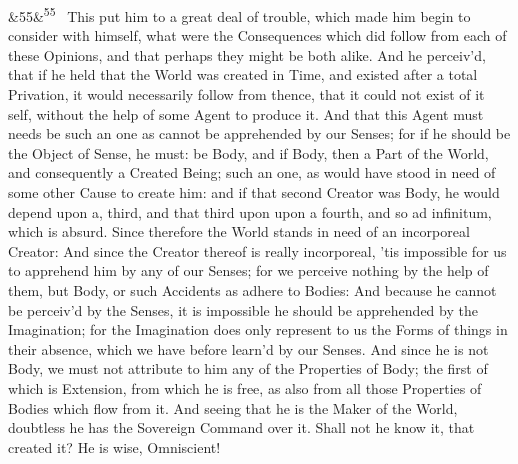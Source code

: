 \documentclass[12pt]{article}
\newcommand{\para}[1][]{\par\noindent\ifx&#1&\else\textsuperscript{\footnotesize #1}~\fi}
\begin{document}
\para[55] This put him to a great deal of trouble, which made him begin to consider with himself, what were the Consequences which did follow from each of these Opinions, and that perhaps they might be both alike. And he perceiv'd, that if he held that the World was created in Time, and existed after a total Privation, it would necessarily follow from thence, that it could not exist of it self, without the help of some Agent to produce it. And that this Agent must needs be such an one as cannot be apprehended by our Senses; for if he should be the Object of Sense, he must: be Body, and if Body, then a Part of the World, and consequently a Created Being; such an one, as would have stood in need of some other Cause to create him: and if that second Creator was Body, he would depend upon a, third, and that third upon upon a fourth, and so ad infinitum, which is absurd. Since therefore the World stands in need of an incorporeal Creator: And since the Creator thereof is really incorporeal, 'tis impossible for us to apprehend him by any of our Senses; for we perceive nothing by the help of them, but Body, or such Accidents as adhere to Bodies: And because he cannot be perceiv'd by the Senses, it is impossible he should be apprehended by the Imagination; for the Imagination does only represent to us the Forms of things in their absence, which we have before learn'd by our Senses. And since he is not Body, we must not attribute to him any of the Properties of Body; the first of which is Extension, from which he is free, as also from all those Properties of Bodies which flow from it. And seeing that he is the Maker of the World, doubtless he has the Sovereign Command over it. Shall not he know it, that created it? He is wise, Omniscient!
\end{document}
